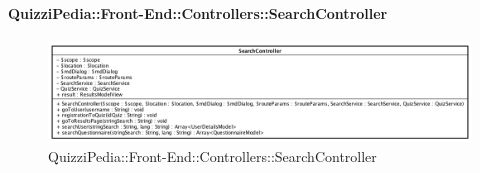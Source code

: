 \paragraph{QuizziPedia::Front-End::Controllers::SearchController}
\begin{figure} [ht]
	\centering
	\includegraphics[scale=0.4]{UML/Classi/Front-End/QuizziPedia_Front-end_Controller_SearchController.png}
	\caption{QuizziPedia::Front-End::Controllers::SearchController}
\end{figure} \FloatBarrier
